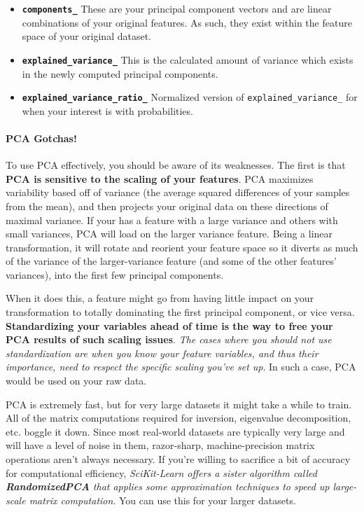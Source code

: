 \documentclass[11pt]{article}
\providecommand{\tightlist}{%
      \setlength{\itemsep}{0pt}\setlength{\parskip}{0pt}}
\begin{document}
\begin{itemize}
\tightlist
\item
  \textbf{\texttt{components\_}} These are your principal component
  vectors and are linear combinations of your original features. As
  such, they exist within the feature space of your original dataset.
\item
  \textbf{\texttt{explained\_variance\_}} This is the calculated amount
  of variance which exists in the newly computed principal components.
\item
  \textbf{\texttt{explained\_variance\_ratio\_}} Normalized version of
  \texttt{explained\_variance\_} for when your interest is with
  probabilities.
\end{itemize}

\hypertarget{pca-gotchas}{%
\paragraph{PCA Gotchas!}\label{pca-gotchas}}

To use PCA effectively, you should be aware of its weaknesses. The first
is that \textbf{PCA is sensitive to the scaling of your features}. PCA
maximizes variability based off of variance (the average squared
differences of your samples from the mean), and then projects your
original data on these directions of maximal variance. If your has a
feature with a large variance and others with small variances, PCA will
load on the larger variance feature. Being a linear transformation, it
will rotate and reorient your feature space so it diverts as much of the
variance of the larger-variance feature (and some of the other features'
variances), into the first few principal components.

When it does this, a feature might go from having little impact on your
transformation to totally dominating the first principal component, or
vice versa. \textbf{Standardizing your variables ahead of time is the
way to free your PCA results of such scaling issues}. \emph{The cases
where you should not use standardization are when you know your feature
variables, and thus their importance, need to respect the specific
scaling you've set up}. In such a case, PCA would be used on your raw
data.

PCA is extremely fast, but for very large datasets it might take a while
to train. All of the matrix computations required for inversion,
eigenvalue decomposition, etc. boggle it down. Since most real-world
datasets are typically very large and will have a level of noise in
them, razor-sharp, machine-precision matrix operations aren't always
necessary. If you're willing to sacrifice a bit of accuracy for
computational efficiency, \emph{SciKit-Learn offers a sister algorithm
called \textbf{RandomizedPCA} that applies some approximation techniques
to speed up large-scale matrix computation}. You can use this for your
larger datasets.
\end{document}
